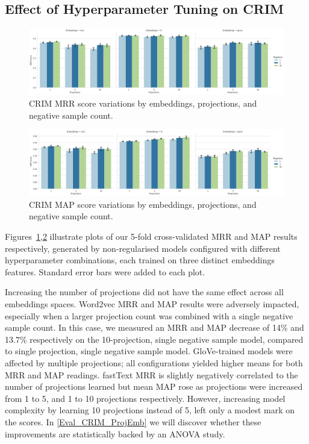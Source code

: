 \subsection{Effect of Hyperparameter Tuning on CRIM} \label{hyper_effect_CRIM}
\begin{figure}[ht!] 
  \centering
  \includegraphics[width=1.\linewidth]{images/CRIM_MRR_score_projection_and_negative_sample.png}
  \caption{CRIM MRR score variations by embeddings, projections, and negative sample count.}
  \label{fig:crim_hyper_mrr}
\end{figure}
\begin{figure}[ht!] 
  \centering
  \includegraphics[width=1.\linewidth]{images/CRIM_MAP_score_projection_and_negative_sample.png}
  \caption{CRIM MAP score variations by embeddings, projections, and negative sample count.}
  \label{fig:crim_hyper_map}
\end{figure}
Figures~\ref{fig:crim_hyper_mrr},\ref{fig:crim_hyper_map} illustrate plots of our 5-fold cross-validated \ac{MRR} and \ac{MAP} results respectively, generated by non-regularised models configured with different hyperparameter combinations, each trained on three distinct embeddings features.  Standard error bars were added to each plot.  

Increasing the number of projections did not have the same effect across all embeddings spaces.  Word2vec \ac{MRR} and \ac{MAP} results were adversely impacted, especially when a larger projection count was combined with a single negative sample count.  In this case, we measured an MRR and MAP decrease of 14\% and 13.7\% respectively on the 10-projection, single negative sample model, compared to single projection, single negative sample model.  GloVe-trained models were affected by multiple projections; all configurations yielded higher means for both \ac{MRR} and \ac{MAP} readings.  fastText \ac{MRR} is slightly negatively correlated to the number of projections learned but mean \ac{MAP} rose as projections were increased from 1 to 5, and 1 to 10 projections respectively.  However, increasing model complexity by learning 10 projections instead of 5, left only a modest mark on the scores.  In \cref{Eval_CRIM_ProjEmb} we will discover whether these improvements are statistically backed by an \ac{ANOVA} study.

